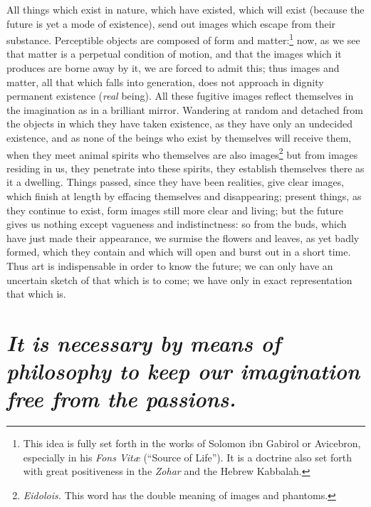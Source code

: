 \documentclass[12pt]{article}
\begin{document}
All things which exist in nature, which have existed, which will exist (because
the future is yet a mode of existence), send out images which escape from their
substance. Perceptible objects are composed of form and matter:\footnote{This
idea is fully set forth in the works of Solomon ibn Gabirol or Avicebron,
especially in his \textit{Fons Vit{\ae}} (``Source of Life''). It is a doctrine
also set forth with great positiveness in the \textit{Zohar} and the Hebrew
Kabbalah.} now, as we see that matter is a perpetual condition of motion, and
that the images which it produces are borne away by it, we are forced to admit
this; thus images and matter, all that which falls into generation, does not
approach in dignity permanent existence (\textit{real} being). All these
fugitive images reflect themselves in the imagination as in a brilliant mirror.
Wandering at random and detached from the objects in which they have taken
existence, as they have only an undecided existence, and as none of the beings
who exist by themselves will receive them, when they meet animal spirits who
themselves are also images\footnote{\textit{Eidolois.} This word has the double
meaning of images and phantoms.} but from images residing in us, they penetrate
into these spirits, they establish themselves there as it a dwelling. Things
passed, since they have been realities, give clear images, which finish at
length by effacing themselves and disappearing; present things, as they
continue to exist, form images still more clear and living; but the future
gives us nothing except vagueness and indistinctness: so from the buds, which
have just made their appearance, we surmise the flowers and leaves, as yet
badly formed, which they contain and which will open and burst out in a short
time. Thus art is indispensable in order to know the future; we can only have
an uncertain sketch of that which is to come; we have only in exact
representation that which is.


\section{\mdseries\itshape It is necessary by means of philosophy to keep our
imagination free from the passions.}
\end{document}
